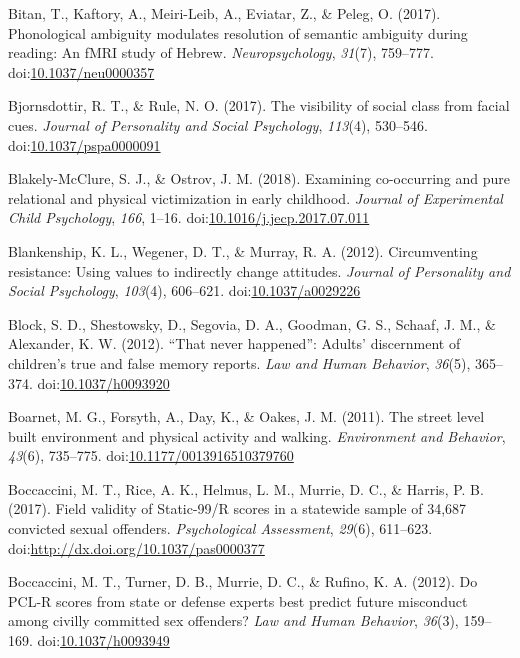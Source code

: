\documentclass[english,man]{apa6}
\begin{document}
\hypertarget{ref-Bitan2017}{}
Bitan, T., Kaftory, A., Meiri-Leib, A., Eviatar, Z., \& Peleg, O.
(2017). Phonological ambiguity modulates resolution of semantic
ambiguity during reading: An fMRI study of Hebrew.
\emph{Neuropsychology}, \emph{31}(7), 759--777.
doi:\href{https://doi.org/10.1037/neu0000357}{10.1037/neu0000357}

\hypertarget{ref-Bjornsdottir2017}{}
Bjornsdottir, R. T., \& Rule, N. O. (2017). The visibility of social
class from facial cues. \emph{Journal of Personality and Social
Psychology}, \emph{113}(4), 530--546.
doi:\href{https://doi.org/10.1037/pspa0000091}{10.1037/pspa0000091}

\hypertarget{ref-Blakely-McClure2018}{}
Blakely-McClure, S. J., \& Ostrov, J. M. (2018). Examining co-occurring
and pure relational and physical victimization in early childhood.
\emph{Journal of Experimental Child Psychology}, \emph{166}, 1--16.
doi:\href{https://doi.org/10.1016/j.jecp.2017.07.011}{10.1016/j.jecp.2017.07.011}

\hypertarget{ref-Blankenship}{}
Blankenship, K. L., Wegener, D. T., \& Murray, R. A. (2012).
Circumventing resistance: Using values to indirectly change attitudes.
\emph{Journal of Personality and Social Psychology}, \emph{103}(4),
606--621. doi:\href{https://doi.org/10.1037/a0029226}{10.1037/a0029226}

\hypertarget{ref-Block}{}
Block, S. D., Shestowsky, D., Segovia, D. A., Goodman, G. S., Schaaf, J.
M., \& Alexander, K. W. (2012). ``That never happened'': Adults'
discernment of children's true and false memory reports. \emph{Law and
Human Behavior}, \emph{36}(5), 365--374.
doi:\href{https://doi.org/10.1037/h0093920}{10.1037/h0093920}

\hypertarget{ref-Boarnet2011}{}
Boarnet, M. G., Forsyth, A., Day, K., \& Oakes, J. M. (2011). The street
level built environment and physical activity and walking.
\emph{Environment and Behavior}, \emph{43}(6), 735--775.
doi:\href{https://doi.org/10.1177/0013916510379760}{10.1177/0013916510379760}

\hypertarget{ref-Boccaccini2017}{}
Boccaccini, M. T., Rice, A. K., Helmus, L. M., Murrie, D. C., \& Harris,
P. B. (2017). Field validity of Static-99/R scores in a statewide sample
of 34,687 convicted sexual offenders. \emph{Psychological Assessment},
\emph{29}(6), 611--623.
doi:\href{https://doi.org/http://dx.doi.org/10.1037/pas0000377}{http://dx.doi.org/10.1037/pas0000377}

\hypertarget{ref-Boccaccini2011}{}
Boccaccini, M. T., Turner, D. B., Murrie, D. C., \& Rufino, K. A.
(2012). Do PCL-R scores from state or defense experts best predict
future misconduct among civilly committed sex offenders? \emph{Law and
Human Behavior}, \emph{36}(3), 159--169.
doi:\href{https://doi.org/10.1037/h0093949}{10.1037/h0093949}
\end{document}
